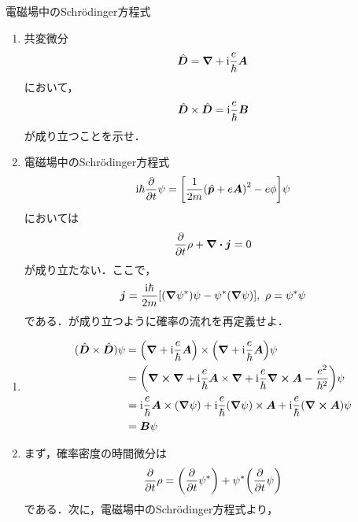 \documentclass{report}
\begin{document}
  \begin{myexc}{電磁場中のSchrödinger方程式}{}
    \begin{enumerate}
      \item 共変微分
        \begin{align}
          \hat{\bm{D}} = \grad + \mathrm{i}\frac{e}{\hbar}\bm{A}
        \end{align}
        において，
        \begin{align}
          \hat{\bm{D}} \times \hat{\bm{D}} = \mathrm{i}\frac{e}{\hbar}\bm{B}
        \end{align}
        が成り立つことを示せ．
      \item 電磁場中のSchrödinger方程式
      \begin{align}
        \mathrm{i}\hbar\pdv{t}\psi = \qty[\frac{1}{2m}\qty(\hat{\bm{p}} + e\bm{A})^2 - e\phi]\psi
      \end{align}
      においては
      \begin{align}
        \pdv{t} \rho + \div \bm{j} = 0 \label{prob-current-exercise}
      \end{align}
      が成り立たない．ここで，
      \begin{align}
        \bm{j} = \frac{\mathrm{i}\hbar}{2m}\qty[(\grad \psi^{*})\psi - \psi^{*} (\grad\psi)],\ \rho = \psi^{*}\psi
      \end{align}
      である．が成り立つように確率の流れを再定義せよ．
    \end{enumerate}
    \tcblower
    \begin{enumerate}
      \item 
        \begin{align}
        (\hat{\bm{D}} \times \hat{\bm{D}})\psi &= \qty(\grad + \mathrm{i}\frac{e}{\hbar}\bm{A}) \times \qty(\grad + \mathrm{i}\frac{e}{\hbar}\bm{A})\psi\\
        &= \qty(\curl\grad + \mathrm{i}\frac{e}{\hbar}\bm{A}\times\grad + \mathrm{i}\frac{e}{\hbar}\curl\bm{A} - \frac{e^2}{\hbar^2})\psi\\
        &= \mathrm{i}\frac{e}{\hbar}\bm{A}\times(\grad\psi) + \mathrm{i}\frac{e}{\hbar}(\grad\psi)\times\bm{A} + \mathrm{i}\frac{e}{\hbar}(\curl\bm{A})\psi\\
        &= \bm{B}\psi
      \end{align}
      \item まず，確率密度の時間微分は
        \begin{align}
          \pdv{t}\rho = \qty(\pdv{t}\psi^{*}) + \psi^{*}\qty(\pdv{t}\psi)
        \end{align}
        である．次に，電磁場中のSchrödinger方程式より，

\end{enumerate}
\end{myexc}
\end{document}
